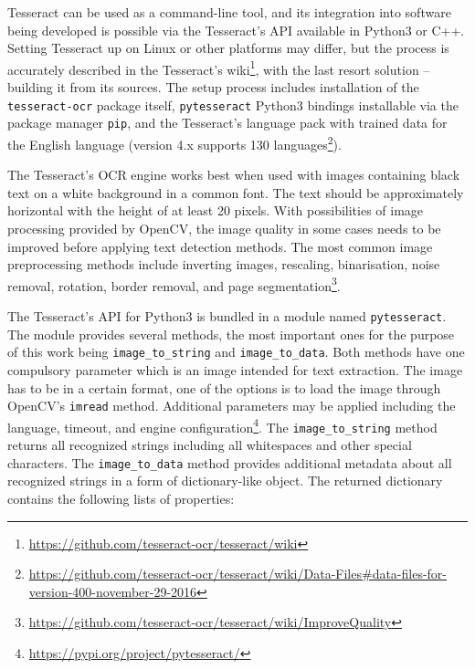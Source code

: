 Tesseract can be used as a command-line tool, and its integration into software being developed is possible via the Tesseract's API available in Python3 or C++. Setting Tesseract up on Linux or other platforms may differ, but the process is accurately described in the Tesseract's wiki\footnote{\url{https://github.com/tesseract-ocr/tesseract/wiki}}, with the last resort solution -- building it from its sources.
The setup process includes installation of the \texttt{tesseract-ocr} package itself, \texttt{pytesseract} Python3 bindings installable via the package manager \texttt{pip}, and the Tesseract's language pack with trained data for the English language (version 4.x supports 130 languages\footnote{\url{https://github.com/tesseract-ocr/tesseract/wiki/Data-Files\#data-files-for-version-400-november-29-2016}}). 

The Tesseract's OCR engine works best when used with images containing black text on a white background in a common font. The text should be approximately horizontal with the height of at least 20 pixels. With possibilities of image processing provided by OpenCV, the image quality in some cases needs to be improved before applying text detection methods. The most common image preprocessing methods include inverting images, rescaling, binarisation, noise removal, rotation, border removal, and page segmentation\footnote{\url{https://github.com/tesseract-ocr/tesseract/wiki/ImproveQuality}}.

The Tesseract's API for Python3 is bundled in a module named \texttt{pytesseract}. The module provides several methods, the most important ones for the purpose of this work being \verb|image_to_string| and \verb|image_to_data|. Both methods have one compulsory parameter which is an image intended for text extraction. The image has to be in a certain format, one of the options is to load the image through OpenCV's \texttt{imread} method. Additional parameters may be applied including the language, timeout, and engine configuration\footnote{\url{https://pypi.org/project/pytesseract/}}. The \verb|image_to_string| method returns all recognized strings including all whitespaces and other special characters. The \verb|image_to_data| method provides additional metadata about all recognized strings in a form of dictionary-like object. The returned dictionary contains the following lists of properties:

